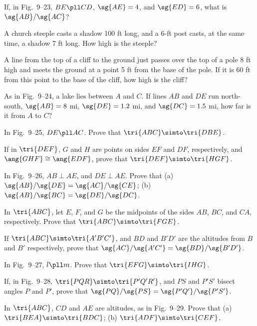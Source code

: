 \documentclass[11pt]{book}
\theoremstyle{bkplain}
\theoremstyle{XIplainnote}
\theoremstyle{bkplain}
\theoremstyle{bkplain}
\begin{document}
\begin{exercisecols}
\begin{exlist}
\item If, in Fig.~9--23, $BE \pll CD$, $\sg{AE} = 4$, and $\sg{ED} = 6$, what is
      $\sg{AB}/\sg{AC}$?
\exfig{\FIGIXTWENTYTHREE}
\item A church steeple casts a shadow 100 ft long, and a 6-ft post casts, at the
      same time, a shadow 7 ft long. How high is the steeple?
\item A line from the top of a cliff to the ground just passes over the top of a
      pole 8 ft high and meets the ground at a point 5 ft from the base of the
      pole. If it is 60 ft from this point to the base of the cliff, how high is
      the cliff?
\item As in Fig.~9--24, a lake lies between $A$ and $C$. If lines $AB$ and $DE$
      run north-south, $\sg{AB} = 8$ mi, $\sg{DE} = 1.2$ mi, and $\sg{DC} = 1.5$
      mi, how far is it from $A$ to $C$?
\exfig{\FIGIXTWENTYFOUR}
\item In Fig.~9--25, $DE \pll AC$. Prove that $\tri{ABC} \simto \tri{DBE}$.
\exfig{\FIGIXTWENTYFIVE}
\item If in $\tri{DEF}$, $G$ and $H$ are points on sides $EF$ and $DF$,
      respectively, and $\ang{GHF} \cong \ang{EDF}$, prove that $\tri{DEF} \simto
      \tri{HGF}$.
\item In Fig.~9--26, $AB \perp AE$, and $DE \perp AE$. Prove that (a)
      $\sg{AB}/\sg{DE} = \sg{AC}/\sg{CE}$; (b) $\sg{AB}/\sg{BC} =
      \sg{DE}/\sg{DC}$.
\exfig{\FIGIXTWENTYSIX}
\item In $\tri{ABC}$, let $E$, $F$, and $G$ be the midpoints of the sides $AB$,
      $BC$, and $CA$, respectively. Prove that $\tri{ABC} \simto \tri{FGE}$.
\item If $\tri{ABC} \simto \tri{A'B'C'}$, and $BD$ and $B'D'$ are the altitudes
      from $B$ and $B'$ respectively, prove that $\sg{AC}/\sg{A'C'} =
      \sg{BD}/\sg{B'D'}$.
\item In Fig.~9--27, $l \pll m$. Prove that $\tri{EFG} \simto \tri{IHG}$.
\exfig{\FIGIXTWENTYSEVEN}
\item If, in Fig.~9--28, $\tri{PQR} \simto \tri{P'Q'R'}$, and $PS$ and $P'S'$
      bisect angles $P$ and $P'$, prove that $\sg{PQ}/\sg{PS} =
      \sg{P'Q'}/\sg{P'S'}$.
\exfig{\FIGIXTWENTYEIGHT}
\item In $\tri{ABC}$, $CD$ and $AE$ are altitudes, as in Fig.~9--29. Prove that
      (a) $\tri{BEA} \simto \tri{BDC}$; (b) $\tri{ADF} \simto \tri{CEF}$.
\exfig{\FIGIXTWENTYNINE}
\end{exlist}
\end{exercisecols}
\end{document}
